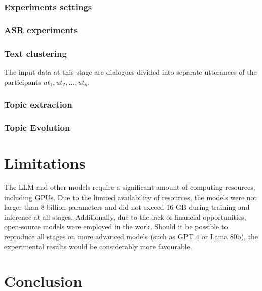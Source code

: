 \documentclass[PMI,VKR]{HSEUniversity}
\begin{document}
\subsection{Experiments settings}



\subsection{ASR experiments}



\subsection{Text clustering}

The input data at this stage are dialogues divided into separate utterances of the participants ${ut_1, ut_2, \dots, ut_n}$.



\subsection{Topic extraction}


\subsection{Topic Evolution}

\chapter{Limitations}

The LLM and other models require a significant amount of computing resources, including GPUs. Due to the limited availability of resources, the models were not larger than 8 billion parameters and did not exceed 16 GB during training and inference at all stages. 
Additionally, due to the lack of financial opportunities, open-source models were employed in the work. Should it be possible to reproduce all stages on more advanced models (such as GPT 4 or Lama 80b), the experimental results would be considerably more favourable.

\chapter{Conclusion}


\putbibliography
\end{document}
